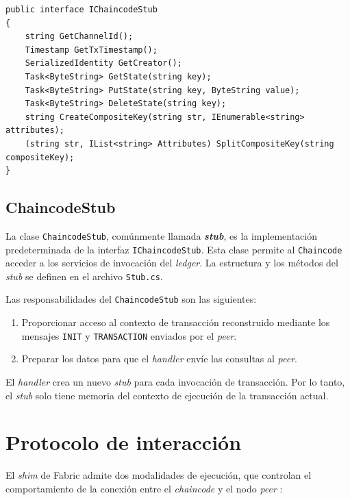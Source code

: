 \begin{lstlisting}[caption={Interfaz \texttt{IChaincodeStub}}, label={code:stub}]
 public interface IChaincodeStub
{
    string GetChannelId();
    Timestamp GetTxTimestamp();
    SerializedIdentity GetCreator();
    Task<ByteString> GetState(string key);
    Task<ByteString> PutState(string key, ByteString value);
    Task<ByteString> DeleteState(string key);
    string CreateCompositeKey(string str, IEnumerable<string> attributes);
    (string str, IList<string> Attributes) SplitCompositeKey(string compositeKey);
}
\end{lstlisting}

\subsection{ChaincodeStub}
La clase \texttt{ChaincodeStub}, comúnmente llamada \textit{\textbf{stub}}, es la implementación predeterminada de la interfaz \texttt{IChaincodeStub}. Esta clase permite al \texttt{Chaincode} acceder a los servicios de invocación del \textit{ledger}. La estructura y los métodos del \textit{stub} se definen en el archivo \texttt{Stub.cs}.

%

Las responsabilidades del \texttt{ChaincodeStub} son las siguientes:

\begin{enumerate}
\item Proporcionar acceso al contexto de transacción reconstruido mediante los mensajes \texttt{INIT} y \texttt{TRANSACTION} enviados por el \textit{peer}.
\item Preparar los datos para que el \textit{handler} envíe las  consultas al \textit{peer}.
\end{enumerate}

El \textit{handler} crea un nuevo \textit{stub} para cada invocación de transacción. Por lo tanto, el \textit{stub} solo tiene memoria del contexto de ejecución de la transacción actual.

\section{Protocolo de interacción}\label{protocolinteraction}
El \textit{shim} de Fabric admite dos modalidades de ejecución, que controlan el comportamiento de la conexión entre el \textit{chaincode} y el nodo \textit{peer} :

